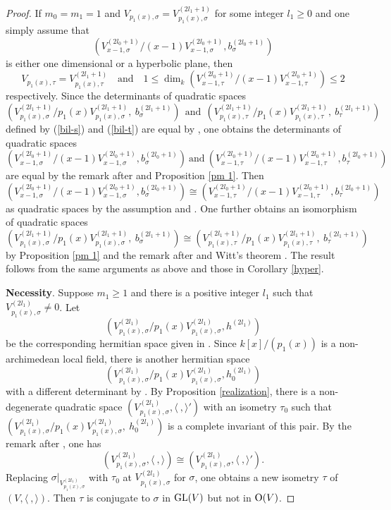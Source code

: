 \documentclass[12pt]{amsart}
\begin{document}
\begin{proof}
If $m_0=m_1=1$ and $V_{p_1(x), \sigma}=V_{p_1(x), \sigma}^{(2l_1+1)}$ for some integer $l_1\geq 0$ and one simply assume that $$(V_{x-1, \sigma}^{(2l_0+1)}/(x-1)V_{x - 1, \sigma}^{(2l_0+1)} , b_\sigma^{(2l_0+1)})$$  is either one dimensional or a hyperbolic plane, then $$V_{p_1(x), \tau}=V_{p_1(x), \tau}^{(2l_1+1)} \ \ \ \text{ and } \ \ \ 
1\leq \dim_k (V_{x-1, \tau}^{(2l_0+1)}/(x-1)V_{x - 1, \tau}^{(2l_0+1)})\leq 2$$ respectively. Since the determinants of quadratic spaces 
$$ ( V_{p_1(x), \sigma}^{(2l_1+1)}/p_1(x) V_{p_1(x), \sigma}^{(2l_1+1)}, \ b_\sigma^{(2l_1+1)} ) \ \ \text{and} \ \ (V_{p_1(x), \tau}^{(2l_1+1)}/ p_1(x) V_{p_1(x), \tau}^{(2l_1+1)}, \ b_{\tau}^{(2l_1+1)}) $$
defined by (\ref{bil-s}) and (\ref{bil-t}) are equal by \cite[Theorem 2.7]{Mil}, one obtains the determinants of quadratic spaces 
$$(V_{x-1, \sigma}^{(2l_0+1)}/(x-1)V_{x - 1, \sigma}^{(2l_0+1)} , b_\sigma^{(2l_0+1)}) \ \text{and} \ (V_{x-1, \tau}^{(2l_0+1)}/(x-1)V_{x - 1, \tau}^{(2l_0+1)} , b_\tau^{(2l_0+1)})$$
are equal by the remark after \cite[Theorem 3.3]{Mil} and Proposition \ref{pm 1}.  Then 
$$(V_{x-1, \sigma}^{(2l_0+1)}/(x-1)V_{x - 1, \sigma}^{(2l_0+1)} , b_\sigma^{(2l_0+1)}) \cong  (V_{x-1, \tau}^{(2l_0+1)}/(x-1)V_{x - 1, \tau}^{(2l_0+1)} , b_\tau^{(2l_0+1)}) $$
as quadratic spaces by the assumption and \cite[42:9]{OM}.  One further obtains an isomorphism of quadratic spaces 
$$( V_{p_1(x), \sigma}^{(2l_1+1)}/p_1(x) V_{p_1(x), \sigma}^{(2l_1+1)}, \ b_\sigma^{(2l_1+1)} ) \cong (V_{p_1(x), \tau}^{(2l_1+1)}/ p_1(x) V_{p_1(x), \tau}^{(2l_1+1)}, \ b_{\tau}^{(2l_1+1)}) $$
by Proposition \ref{pm 1} and the remark after \cite[Theorem 3.3]{Mil} and Witt's theorem \cite[42:16. Theorem]{OM}. The result follows from the same arguments as above and those in Corollary \ref{hyper}.

\medskip


{\bf Necessity}. Suppose $m_1\geq 1$ and there is a positive integer $l_1$ such that $V_{p_1(x), \sigma}^{(2l_1)} \neq 0$. Let $$( V_{p_1(x), \sigma}^{(2l_1)} / p_1(x) V_{p_1(x), \sigma}^{(2l_1)} ,  h^{(2l_1)} )$$ be the corresponding hermitian space given in \cite[Theorem 3.3]{Mil}. Since $k[x]/(p_1(x))$ is a non-archimedean local field, there is another hermitian space
$$(V_{p_1(x), \sigma}^{(2l_1)} / p_1(x) V_{p_1(x), \sigma}^{(2l_1)} ,  h_0^{(2l_1)} )$$
with a different determinant by \cite[Example 3, \S 1]{Mil}. By Proposition \ref{realization},  there is a non-degenerate quadratic space $(V_{p_1(x), \sigma}^{(2l_1)} , \langle \ , \rangle ')$ with an isometry $\tau_0$ such that $(V_{p_1(x), \sigma}^{(2l_1)} / p_1(x) V_{p_1(x), \sigma}^{(2l_1)} , \ h_0^{(2l_1)} )$ is a complete invariant of this pair. By the remark after \cite[Theorem 3.3]{Mil}, one has 
$$(V_{p_1(x), \sigma}^{(2l_1)} , \langle \ , \rangle ) \cong (V_{p_1(x), \sigma}^{(2l_1)} , \langle \ , \rangle '). $$
Replacing $\sigma |_{V_{p_1(x), \sigma}^{(2l_1)}}$ with $\tau_0$ at $V_{p_1(x), \sigma}^{(2l_1)} $ for $\sigma$, one obtains a new isometry $\tau$ of $(V, \langle \ , \rangle)$. Then $\tau$ is conjugate to $\sigma$ in ${\rm GL}(V)$ but not in ${\rm O}(V)$. 


\end{proof}
\end{document}
